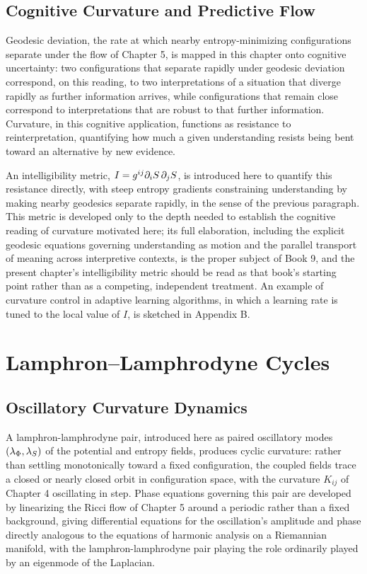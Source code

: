 \chapter{Cognitive Curvature and Predictive Flow}

Geodesic deviation, the rate at which nearby entropy-minimizing configurations separate under the flow of Chapter 5, is mapped in this chapter onto cognitive uncertainty: two configurations that separate rapidly under geodesic deviation correspond, on this reading, to two interpretations of a situation that diverge rapidly as further information arrives, while configurations that remain close correspond to interpretations that are robust to that further information. Curvature, in this cognitive application, functions as resistance to reinterpretation, quantifying how much a given understanding resists being bent toward an alternative by new evidence.

An intelligibility metric, $I = g^{ij} \partial_i S \, \partial_j S$, is introduced here to quantify this resistance directly, with steep entropy gradients constraining understanding by making nearby geodesics separate rapidly, in the sense of the previous paragraph. This metric is developed only to the depth needed to establish the cognitive reading of curvature motivated here; its full elaboration, including the explicit geodesic equations governing understanding as motion and the parallel transport of meaning across interpretive contexts, is the proper subject of Book 9, and the present chapter's intelligibility metric should be read as that book's starting point rather than as a competing, independent treatment. An example of curvature control in adaptive learning algorithms, in which a learning rate is tuned to the local value of $I$, is sketched in Appendix B.

\part{Lamphron--Lamphrodyne Cycles}

\chapter{Oscillatory Curvature Dynamics}

A lamphron-lamphrodyne pair, introduced here as paired oscillatory modes $(\lambda_{\Phi}, \lambda_{S})$ of the potential and entropy fields, produces cyclic curvature: rather than settling monotonically toward a fixed configuration, the coupled fields trace a closed or nearly closed orbit in configuration space, with the curvature $K_{ij}$ of Chapter 4 oscillating in step. Phase equations governing this pair are developed by linearizing the Ricci flow of Chapter 5 around a periodic rather than a fixed background, giving differential equations for the oscillation's amplitude and phase directly analogous to the equations of harmonic analysis on a Riemannian manifold, with the lamphron-lamphrodyne pair playing the role ordinarily played by an eigenmode of the Laplacian.

